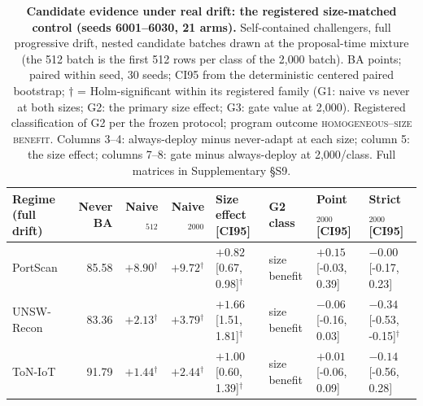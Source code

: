 \begin{table}[t]
\centering
\caption{\textbf{Candidate evidence under real drift: the registered size-matched control
(seeds 6001--6030, 21 arms).} Self-contained challengers, full progressive drift, nested
candidate batches drawn at the proposal-time mixture (the 512 batch is the first 512 rows
per class of the 2{,}000 batch). BA points; paired within seed, 30 seeds; CI95 from the
deterministic centered paired bootstrap; $\dagger$ = Holm-significant within its registered
family (G1: naive vs never at both sizes; G2: the primary size effect; G3: gate value at
2{,}000). Registered classification of G2 per the frozen protocol; program outcome
\textsc{homogeneous--size benefit}. Columns 3--4: always-deploy
minus never-adapt at each size; column 5: the size effect; columns 7--8: gate minus
always-deploy at 2{,}000/class. Full matrices in Supplementary \S S9.}
\label{tab:size_matched_drift}
\footnotesize
\setlength{\tabcolsep}{3pt}
\begin{tabular}{l r r r l l l l}
\toprule
Regime (full drift) & Never BA & Naive$_{512}$ & Naive$_{2000}$ &
Size effect [CI95] & G2 class & Point$_{2000}$ [CI95] & Strict$_{2000}$ [CI95] \\
\midrule
PortScan & 85.58 & $+8.90$$^{\dagger}$ & $+9.72$$^{\dagger}$ & $+0.82$ [0.67, 0.98]$^{\dagger}$ & size benefit & $+0.15$ [-0.03, 0.39] & $-0.00$ [-0.17, 0.23] \\
UNSW-Recon & 83.36 & $+2.13$$^{\dagger}$ & $+3.79$$^{\dagger}$ & $+1.66$ [1.51, 1.81]$^{\dagger}$ & size benefit & $-0.06$ [-0.16, 0.03] & $-0.34$ [-0.53, -0.15]$^{\dagger}$ \\
ToN-IoT & 91.79 & $+1.44$$^{\dagger}$ & $+2.44$$^{\dagger}$ & $+1.00$ [0.60, 1.39]$^{\dagger}$ & size benefit & $+0.01$ [-0.06, 0.09] & $-0.14$ [-0.56, 0.28] \\
\bottomrule
\end{tabular}
\end{table}
